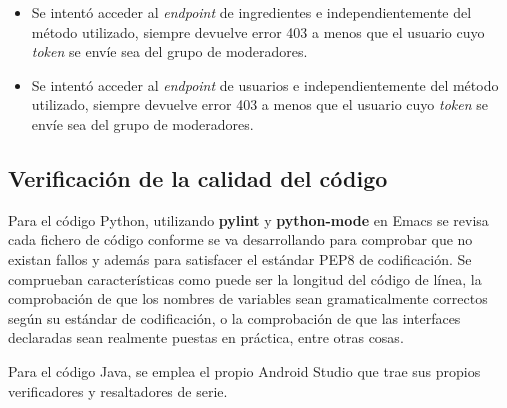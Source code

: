\begin{itemize}
\begin{itemize}
\begin{verbatim}
{"detail":"You do not have permission to perform this action."}%               
    \end{verbatim}

    Si las credenciales son válidas y el usuario forma parte del grupo de
    Moderadores, se devuelve un código 200 y se efectúa la operación correctamente.

    \begin{verbatim}
$ curl -X METHOD http://amuse-bouche.noeliarcado.es/recipes/1/ \
      -H 'Authorization: Token token'    
    \end{verbatim}
    
  \end{itemize}
  
\item Se intentó acceder al \textit{endpoint} de ingredientes e independientemente
  del método utilizado, siempre devuelve error 403 a menos que el usuario
  cuyo \textit{token} se envíe sea del grupo de moderadores.
\item Se intentó acceder al \textit{endpoint} de usuarios e independientemente
  del método utilizado, siempre devuelve error 403 a menos que el usuario
  cuyo \textit{token} se envíe sea del grupo de moderadores.
\end{itemize}

\subsection{Verificación de la calidad del código}

Para el código Python, utilizando \textbf{pylint} y \textbf{python-mode} en
Emacs se revisa cada fichero de código conforme se va desarrollando para
comprobar que no existan fallos y además para satisfacer el estándar PEP8 de
codificación. Se comprueban características como puede ser la longitud del
código de línea, la comprobación de que los nombres de variables sean
gramaticalmente correctos según su estándar de codificación, o la comprobación
de que las interfaces declaradas sean realmente puestas en práctica, entre otras
cosas.

Para el código Java, se emplea el propio Android Studio que trae sus propios
verificadores y resaltadores de serie.
